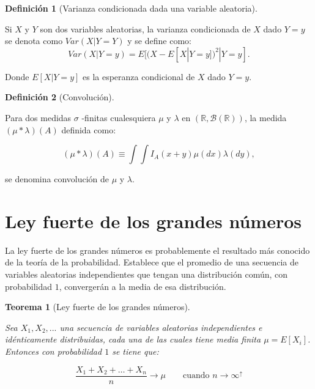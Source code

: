 \documentclass[
  us-letterpaper,
]{scrreprt}
\theoremstyle{plain}
\theoremstyle{plain}
\newtheorem{theorem}{Teorema}[chapter]
\theoremstyle{definition}
\newtheorem{definition}{Definición}[chapter]
\theoremstyle{remark}
\begin{document}
\begin{definition}[Varianza condicionada dada una variable
aleatoria]\protect\hypertarget{def-vari_cond_var_ale}{}\label{def-vari_cond_var_ale}

Si \(X\) y \(Y\) son dos variables aleatorias, la varianza condicionada
de \(X\) dado \(Y=y\) se denota como \(Var(X | Y=Y)\) y se define como:
\[Var( X | Y = y) = E[(X - E[X|Y=y])^2 | Y = y].\]

Donde \(E[X |Y =y]\) es la esperanza condicional de \(X\) dado
\(Y = y\).

\end{definition}

\begin{definition}[Convolución]\protect\hypertarget{def-convolucion}{}\label{def-convolucion}

Para dos medidas \(\sigma\) -finitas cualesquiera \(\mu\) y \(\lambda\)
en \((\mathbb{R}, \mathcal{B}(\mathbb{R}))\), la medida
\((\mu*\lambda)(A)\) definida como:

\[
(\mu*\lambda)(A) \equiv \int \int I_A(x+y)\mu(dx)\lambda(dy),
\]

se denomina convolución de \(\mu\) y \(\lambda\).

\end{definition}

\section{Ley fuerte de los grandes
números}\label{ley-fuerte-de-los-grandes-nuxfameros}

La ley fuerte de los grandes números es probablemente el resultado más
conocido de la teoría de la probabilidad. Establece que el promedio de
una secuencia de variables aleatorias independientes que tengan una
distribución común, con probabilidad \(1\), convergerán a la media de
esa distribución.

\begin{theorem}[Ley fuerte de los grandes
números]\protect\hypertarget{thm-ley_f_gran_num}{}\label{thm-ley_f_gran_num}

Sea \(X_1, X_2, ...\) una secuencia de variables aleatorias
independientes e idénticamente distribuidas, cada una de las cuales
tiene media finita \(\mu = E[X_i]\). Entonces con probabilidad \(1\) se
tiene que:

\[ \frac{X_1 + X_2 + \dots + X_n}{n} \rightarrow \mu \qquad \text{cuando $n \rightarrow \infty^{\uparrow}$} \]

\end{theorem}
\end{document}
